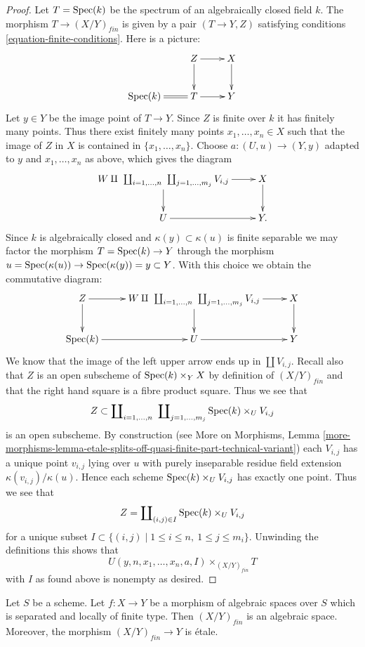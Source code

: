 \begin{proof}
\medskip\noindent
Let $T = \mathop{\mathrm{Spec}}(k)$ be the spectrum of an algebraically closed
field $k$. The morphism $T \to (X/Y)_{fin}$ is given by a pair
$(T \to Y, Z)$ satisfying conditions \ref{equation-finite-conditions}.
Here is a picture:
$$
\xymatrix{
& Z \ar[d] \ar[r] & X \ar[d] \\
\Spec(k) \ar@{=}[r] & T \ar[r] & Y
}
$$
Let $y \in Y$ be the image point of $T \to Y$.
Since $Z$ is finite over $k$ it has finitely many points.
Thus there exist finitely many points $x_1, \ldots, x_n \in X$
such that the image of $Z$ in $X$ is contained in $\{x_1, \ldots, x_n\}$.
Choose $a : (U, u) \to (Y, y)$ adapted to $y$ and $x_1, \ldots, x_n$ as
above, which gives the diagram
$$
\xymatrix{
W \amalg
\ \coprod\nolimits_{i = 1, \ldots, n}
\ \coprod\nolimits_{j = 1, \ldots, m_j}
V_{i, j} \ar[d] \ar[r] &
X \ar[d] \\
U \ar[r] & Y.
}
$$
Since $k$ is algebraically closed and
$\kappa(y) \subset \kappa(u)$ is finite separable
we may factor the morphism
$T = \mathop{\mathrm{Spec}}(k) \to Y$ through the morphism
$u = \mathop{\mathrm{Spec}}(\kappa(u)) \to \mathop{\mathrm{Spec}}(\kappa(y)) = y \subset Y$.
With this choice we obtain the commutative diagram:
$$
\xymatrix{
Z \ar[d] \ar[r] &
W \amalg
\ \coprod\nolimits_{i = 1, \ldots, n}
\ \coprod\nolimits_{j = 1, \ldots, m_j}
V_{i, j} \ar[d] \ar[r] &
X \ar[d] \\
\Spec(k) \ar[r] &
U \ar[r] & Y
}
$$
We know that the image of the left upper arrow ends up in
$\coprod V_{i, j}$. Recall also that $Z$ is an open subscheme
of $\mathop{\mathrm{Spec}}(k) \times_Y X$ by definition of $(X/Y)_{fin}$
and that the right hand square is a fibre product square.
Thus we see that
$$
Z \subset
\coprod\nolimits_{i = 1, \ldots, n}\ \coprod\nolimits_{j = 1, \ldots, m_j}
\mathop{\mathrm{Spec}}(k) \times_U V_{i, j}
$$
is an open subscheme. By construction (see
More on Morphisms, Lemma
\ref{more-morphisms-lemma-etale-splits-off-quasi-finite-part-technical-variant})
each $V_{i, j}$ has a unique point $v_{i, j}$ lying over $u$
with purely inseparable residue field extension
$\kappa(v_{i, j})/\kappa(u)$. Hence each
scheme $\mathop{\mathrm{Spec}}(k) \times_U V_{i, j}$ has exactly one
point. Thus we see that
$$
Z = \coprod\nolimits_{(i, j) \in I} \mathop{\mathrm{Spec}}(k) \times_U V_{i, j}
$$
for a unique subset
$I \subset \{(i, j) \mid 1 \leq i \leq n, \ 1 \leq j \leq m_i\}$.
Unwinding the definitions this shows that
$$
U(y, n, x_1, \ldots, x_n, a, I) \times_{(X/Y)_{fin}} T
$$
with $I$ as found above is nonempty as desired.
\end{proof}

\begin{proposition}
\label{proposition-finite-algebraic-space}
Let $S$ be a scheme.
Let $f : X \to Y$ be a morphism of algebraic spaces over $S$ which
is separated and locally of finite type. Then $(X/Y)_{fin}$
is an algebraic space. Moreover, the morphism
$(X/Y)_{fin} \to Y$ is \'etale.
\end{proposition}


